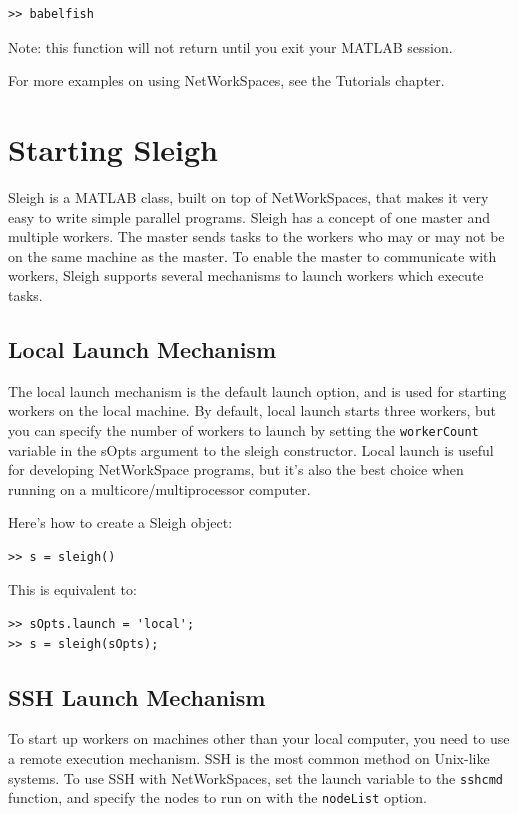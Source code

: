 \begin{verbatim}
>> babelfish
\end{verbatim}

Note: this function will not return until you exit your MATLAB session.

For more examples on using NetWorkSpaces, see the Tutorials chapter.

\section{Starting Sleigh}
Sleigh is a MATLAB class, built on top of NetWorkSpaces, that makes it
very easy to write simple parallel programs.  Sleigh has a concept of one
master and multiple workers.  The master sends tasks to the workers who may or
may not be on the same machine as the master.  To enable the master to
communicate with workers, Sleigh supports several mechanisms to launch workers
which execute tasks.

\subsection{Local Launch Mechanism}
The local launch mechanism is the default launch option, and is used for
starting workers on the local machine.  By default, local launch starts
three workers, but you can specify the number of workers to launch by
setting the \texttt{workerCount} variable in the sOpts argument to the
sleigh constructor.  Local launch is useful for developing NetWorkSpace
programs, but it's also the best choice when running on a
multicore/multiprocessor computer.

Here's how to create a Sleigh object:

\begin{samepage}
\begin{verbatim}
>> s = sleigh()
\end{verbatim}
\end{samepage}

This is equivalent to:

\begin{samepage}
\begin{verbatim}
>> sOpts.launch = 'local';
>> s = sleigh(sOpts);
\end{verbatim}
\end{samepage}

\subsection{SSH Launch Mechanism}
To start up workers on machines other than your local computer, you need
to use a remote execution mechanism.  SSH is the most common method on
Unix-like systems.  To use SSH with NetWorkSpaces, set the launch
variable to the \texttt{sshcmd} function, and specify the nodes to run
on with the \texttt{nodeList} option.

